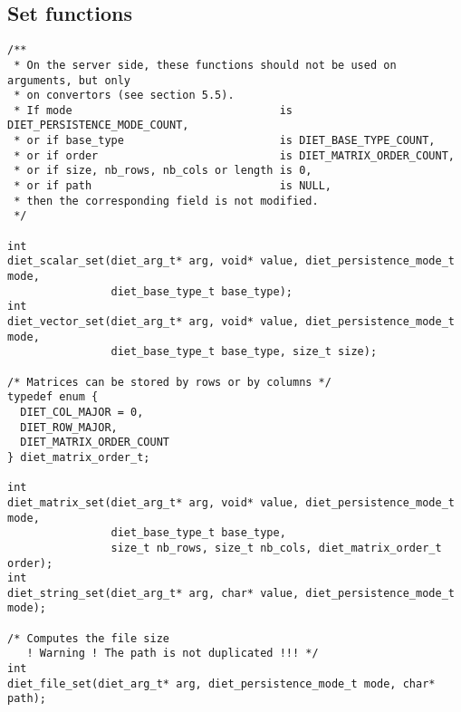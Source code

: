 \subsection{Set functions}


\label{sec:setfun}
{\footnotesize
\begin{verbatim}
/**
 * On the server side, these functions should not be used on arguments, but only
 * on convertors (see section 5.5).
 * If mode                                is DIET_PERSISTENCE_MODE_COUNT, 
 * or if base_type                        is DIET_BASE_TYPE_COUNT,
 * or if order                            is DIET_MATRIX_ORDER_COUNT,
 * or if size, nb_rows, nb_cols or length is 0,
 * or if path                             is NULL,
 * then the corresponding field is not modified.
 */

int
diet_scalar_set(diet_arg_t* arg, void* value, diet_persistence_mode_t mode,
                diet_base_type_t base_type);
int
diet_vector_set(diet_arg_t* arg, void* value, diet_persistence_mode_t mode,
                diet_base_type_t base_type, size_t size);

/* Matrices can be stored by rows or by columns */
typedef enum {
  DIET_COL_MAJOR = 0,
  DIET_ROW_MAJOR,
  DIET_MATRIX_ORDER_COUNT
} diet_matrix_order_t;

int
diet_matrix_set(diet_arg_t* arg, void* value, diet_persistence_mode_t mode,
                diet_base_type_t base_type,
                size_t nb_rows, size_t nb_cols, diet_matrix_order_t order);
int
diet_string_set(diet_arg_t* arg, char* value, diet_persistence_mode_t mode);

/* Computes the file size
   ! Warning ! The path is not duplicated !!! */
int
diet_file_set(diet_arg_t* arg, diet_persistence_mode_t mode, char* path);
\end{verbatim}
}


